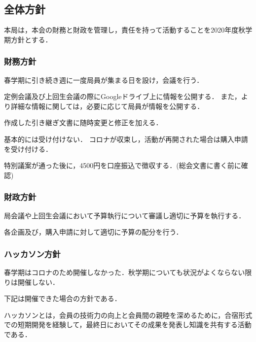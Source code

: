 \subsection*{全体方針}



本局は，本会の財務と財政を管理し，責任を持って活動することを2020年度秋学期方針とする．


\subsubsection*{財務方針}

春学期に引き続き週に一度局員が集まる日を設け，会議を行う．

定例会議及び上回生会議の際にGoogleドライブ上に情報を公開する．
また，より詳細な情報に関しては，必要に応じて局員が情報を公開する．

作成した引き継ぎ文書に随時変更と修正を加える．

基本的には受け付けない．
コロナが収束し，活動が再開された場合は購入申請を受け付ける．

特別議案が通った後に，4500円を口座振込で徴収する．(総会文書に書く前に確認)


\subsubsection*{財政方針}

局会議や上回生会議において予算執行について審議し適切に予算を執行する．

各企画及び，購入申請に対して適切に予算の配分を行う．


\subsubsection*{ハッカソン方針}
春学期はコロナのため開催しなかった．秋学期についても状況がよくならない限りは開催しない．

下記は開催できた場合の方針である．

ハッカソンとは，会員の技術力の向上と会員間の親睦を深めるために，合宿形式での短期開発を経験して，最終日においてその成果を発表し知識を共有する活動である．

